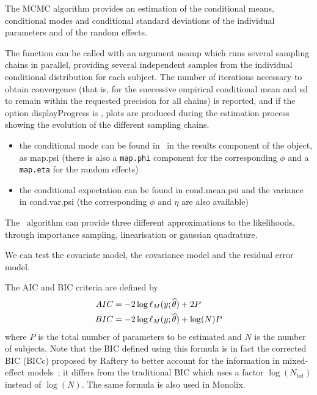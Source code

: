 The MCMC algorithm provides an estimation of the conditional means, conditional modes and conditional standard deviations of the individual parameters and of the random effects. 

The function can be called with an argument {\sf nsamp} which runs several sampling chains in parallel, providing several independent samples from the individual conditional distribution for each subject. The number of iterations necessary to obtain convergence (that is, for the successive empirical conditional mean and sd to remain within the requested precision for all chains) is reported, and if the option {\sf displayProgress} is \true, plots are produced during the estimation process showing the evolution of the different sampling chains.

\begin{itemize}
\item the conditional mode can be found in \monolix~in the results component of the object, as {\sf map.psi} (there is also a \texttt{map.phi} component for the corresponding $\phi$ and a \texttt{map.eta} for the random effects)
\item the conditional expectation can be found in {\sf cond.mean.psi} and the variance in {\sf cond.var.psi} (the corresponding $\phi$ and $\eta$ are also available)
\end{itemize}


The \monolix~algorithm can provide three different approximations to the likelihoods, through importance sampling, linearisation or gaussian quadrature. 



We can test the covariate model, the covariance model and the residual error model.

The AIC and BIC criteria are defined by
\begin{eqnarray}
	AIC &= - 2 \log \ell_M(y;{\widehat{\theta}}) + 2 P \\
	BIC &= - 2 \log \ell_M(y;{\widehat{\theta}}) + \log(N) P \label{BICN}
\end{eqnarray}
where $P$ is the total number of parameters to be estimated and $N$ is the number of subjects. Note that the BIC defined using this formula is in fact the corrected BIC (BICc) proposed by Raftery to better account for the information in mixed-effect models~\cite{Raftery95}; it differs from the traditional BIC which uses a factor $\log(N_{tot})$ instead of $\log(N)$. The same formula is also used in {\sc Monolix}.

